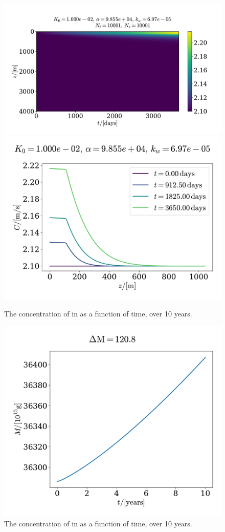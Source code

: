 \documentclass{article}
\begin{document}
    \begin{figure}[h]
        \centering
        \includegraphics[width=.60\textwidth]{../plots/prob3}
        \includegraphics[width=.39\textwidth]{../plots/prob3_i}
        \caption{The concentration of  in as a function of time, over 10 years.}
        \label{prob3}
    \end{figure}
    \begin{figure}[h]
        \centering
        \includegraphics[width=.60\textwidth]{../plots/prob3_M}
        \caption{The concentration of  in as a function of time, over 10 years.}
        \label{prob3 mass}
    \end{figure}


    
       
\end{document}
